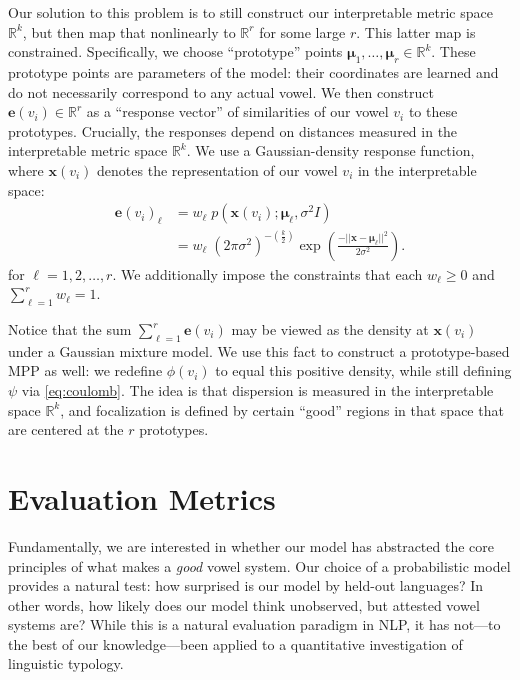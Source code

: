 \documentclass[11pt,a4paper]{article}
\renewcommand{\vec}[1]{{\boldsymbol{\mathbf{#1}}}}
\newcommand{\Real}{\mathbb{R}}
\newcommand{\e}{{\boldsymbol e}}
\begin{document}
Our solution to this problem is to still construct our interpretable
metric space $\Real^k$, but then map that nonlinearly 
to $\Real^r$ for some large $r$.  This latter map is
constrained.  Specifically, we choose ``prototype'' points
$\vec{\mu}_1,\ldots,\vec{\mu}_r \in \Real^k$.  These prototype points are parameters of the model: their coordinates are learned and do not necessarily correspond to any actual vowel.  We then construct $\e(v_i) \in \Real^r$ as a ``response vector'' of similarities of our vowel $v_i$ to these prototypes.  Crucially, the responses depend on
distances measured in the interpretable metric space $\Real^k$.  We use a Gaussian-density response
function, where $\vec{x}(v_i)$ denotes the representation of our vowel $v_i$ in the
interpretable space:
\begin{align}
  \e(v_i)_\ell &= w_\ell \; p(\vec{x}(v_i); \vec{\mu}_\ell, \sigma^2 I) \\
  &= w_\ell \;(2\pi \sigma^2)^{-\left(\frac{k}{2}\right)} \exp\left( \frac{-||\vec{x} - \vec{\mu}_\ell||^2}{2\sigma^2}\right). \nonumber
\end{align}
for $\ell = 1,2,\ldots,r$.  We additionally impose the constraints that
each $w_\ell \geq 0$ and $\sum_{\ell=1}^r
w_\ell = 1$. 

Notice that the sum $\sum_{\ell=1}^r \e(v_i)$ may be viewed as the density at
$\vec{x}(v_i)$ under a Gaussian mixture model.  We use this fact to
construct a prototype-based MPP as well: we redefine $\phi(v_i)$
to equal this positive density, while still defining $\psi$ via
\cref{eq:coulomb}.  The idea is that dispersion is measured in the
interpretable space $\Real^k$, and focalization is defined by
certain ``good'' regions in that space that are centered at the $r$
prototypes.

\section{Evaluation Metrics}\label{sec:evaluation}
Fundamentally, we are interested in whether our model has abstracted
the core principles of what makes a {\em good} vowel system. Our
choice of a probabilistic model provides a natural test: how surprised
is our model by held-out languages? In other words, how likely does
our model think unobserved, but attested vowel systems are?  While
this is a natural evaluation paradigm in NLP, it has not---to the best
of our knowledge---been applied to a quantitative investigation of
linguistic typology.
\end{document}
